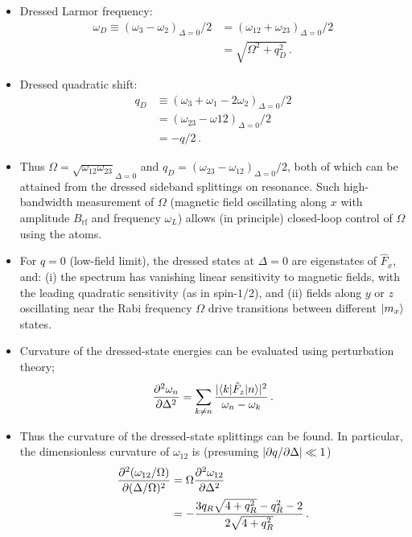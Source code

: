 \documentclass[aps,prl,reprint,superscriptaddress,floatfix]{revtex4-1}
\begin{document}
\begin{itemize}
    \item Dressed Larmor frequency:
    \begin{align*}
        \omega_D \equiv (\omega_3 - \omega_2)_{\Delta=0}/2 &= (\omega_{12} + \omega_{23})_{\Delta=0}/2 \\ &= \sqrt{\Omega^2 + q_D^2}\, .
    \end{align*}
    \item Dressed quadratic shift:
    \begin{align*}
        q_D &\equiv (\omega_3 + \omega_1 -2\omega_2)_{\Delta=0}/2 \\
            &= (\omega_{23}-\omega{12})_{\Delta=0}/2\\ 
            &= -q/2 \, .
     \end{align*}
    \item Thus $\Omega = \sqrt{\omega_{12} \omega_{23}}_{\Delta=0}$ and $q_D = (\omega_{23} - \omega_{12})_{\Delta=0}/2$, both of which can be attained from the dressed sideband splittings on resonance.
    Such high-bandwidth measurement of $\Omega$ (magnetic field oscillating along $x$ with amplitude $B_{\text{rf}}$ and frequency $\omega_L$) allows (in principle) closed-loop control of $\Omega$ using the atoms.
    \item For $q=0$ (low-field limit), the dressed states at $\Delta=0$ are eigenstates of $\hat{F}_x$, and: (i) the spectrum has vanishing linear sensitivity to magnetic fields, with the leading quadratic sensitivity (as in spin-$1/2$), and (ii) fields along $y$ or $z$ oscillating near the Rabi frequency $\Omega$ drive transitions between different $\vert m_x \rangle $ states. 
    \item Curvature of the dressed-state energies can be evaluated using perturbation theory;
    \[
    \frac{\partial ^2\omega_n}{\partial \Delta^2} = \sum_{k \neq n} \frac{\vert \langle k \vert  \hat{F}_z \vert n \rangle  \vert ^2}{\omega_n - \omega_k} \, .
    \]
    \item Thus the curvature of the dressed-state splittings can be found. In particular, the dimensionless curvature of $\omega_{12}$ is (presuming $\vert \partial q / \partial \Delta \vert  \ll 1$) 
    \begin{align*}
    \frac{\partial ^2(\omega_{12}/\Omega)}{\partial (\Delta/\Omega)^2} &= \Omega \frac{\partial ^2\omega_{12}}{\partial \Delta^2} \\ &= -\frac{3 q_R \sqrt{4 + q_R^2} - q_R^2 - 2}{2 \sqrt{4 + q_R^2}} \, .
    \end{align*}

\end{itemize}
\end{document}
